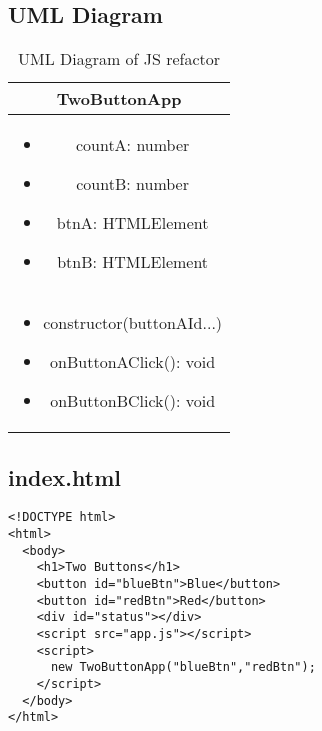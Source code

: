 \subsection{UML Diagram}
\begin{table}[h!]
\centering  %
\begin{tabular}{|c|}
\hline
TwoButtonApp \\ \hline
\begin{minipage}{6cm}  %
\begin{itemize}
  \renewcommand{\labelitemi}{--}
  \item countA: number
  \item countB: number
  \item btnA: HTMLElement
  \item btnB: HTMLElement
\end{itemize}
\end{minipage} \\ \hline
\begin{minipage}{6cm}  %
\begin{itemize}
  \renewcommand{\labelitemi}{+}
  \item constructor(buttonAId...)
  \item onButtonAClick(): void
  \item onButtonBClick(): void
\end{itemize}
\end{minipage} \\ \hline
\end{tabular}

\caption{UML Diagram of JS refactor}
\end{table}

\subsection{index.html}
\begin{verbatim}
<!DOCTYPE html>
<html>
  <body>
    <h1>Two Buttons</h1>
    <button id="blueBtn">Blue</button>
    <button id="redBtn">Red</button>
    <div id="status"></div>
    <script src="app.js"></script>
    <script>
      new TwoButtonApp("blueBtn","redBtn");
    </script>
  </body>
</html>
\end{verbatim}

